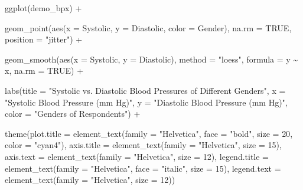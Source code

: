 \documentclass[
]{book}
\newenvironment{Shaded}{\begin{snugshade}}{\end{snugshade}}
\newcommand{\AttributeTok}[1]{\textcolor[rgb]{0.77,0.63,0.00}{#1}}
\newcommand{\ConstantTok}[1]{\textcolor[rgb]{0.00,0.00,0.00}{#1}}
\newcommand{\DecValTok}[1]{\textcolor[rgb]{0.00,0.00,0.81}{#1}}
\newcommand{\FunctionTok}[1]{\textcolor[rgb]{0.00,0.00,0.00}{#1}}
\newcommand{\NormalTok}[1]{#1}
\newcommand{\SpecialCharTok}[1]{\textcolor[rgb]{0.00,0.00,0.00}{#1}}
\newcommand{\StringTok}[1]{\textcolor[rgb]{0.31,0.60,0.02}{#1}}
\begin{document}
\begin{Shaded}
\begin{Highlighting}[]
\FunctionTok{ggplot}\NormalTok{(demo\_bpx) }\SpecialCharTok{+}

    \FunctionTok{geom\_point}\NormalTok{(}\FunctionTok{aes}\NormalTok{(}\AttributeTok{x =}\NormalTok{ Systolic, }\AttributeTok{y =}\NormalTok{ Diastolic, }\AttributeTok{color =}\NormalTok{ Gender), }
             \AttributeTok{na.rm =} \ConstantTok{TRUE}\NormalTok{,}
             \AttributeTok{position =} \StringTok{"jitter"}\NormalTok{) }\SpecialCharTok{+}
    
    \FunctionTok{geom\_smooth}\NormalTok{(}\FunctionTok{aes}\NormalTok{(}\AttributeTok{x =}\NormalTok{ Systolic, }\AttributeTok{y =}\NormalTok{ Diastolic),}
                \AttributeTok{method =} \StringTok{"loess"}\NormalTok{,}
                \AttributeTok{formula =}\NormalTok{ y }\SpecialCharTok{\textasciitilde{}}\NormalTok{ x,}
                \AttributeTok{na.rm =} \ConstantTok{TRUE}\NormalTok{) }\SpecialCharTok{+} 
    
    \FunctionTok{labs}\NormalTok{(}\AttributeTok{title =} \StringTok{"Systolic vs. Diastolic Blood Pressures of Different Genders"}\NormalTok{,}
         \AttributeTok{x =} \StringTok{"Systolic Blood Pressure (mm Hg)"}\NormalTok{, }
         \AttributeTok{y =} \StringTok{"Diastolic Blood Pressure (mm Hg)"}\NormalTok{,}
         \AttributeTok{color =} \StringTok{"Genders of Respondents"}\NormalTok{) }\SpecialCharTok{+}

    \FunctionTok{theme}\NormalTok{(}\AttributeTok{plot.title =} \FunctionTok{element\_text}\NormalTok{(}\AttributeTok{family =} \StringTok{"Helvetica"}\NormalTok{, }\AttributeTok{face =} \StringTok{"bold"}\NormalTok{, }\AttributeTok{size =} \DecValTok{20}\NormalTok{, }\AttributeTok{color =} \StringTok{"cyan4"}\NormalTok{),}
          \AttributeTok{axis.title =} \FunctionTok{element\_text}\NormalTok{(}\AttributeTok{family =} \StringTok{"Helvetica"}\NormalTok{, }\AttributeTok{size =} \DecValTok{15}\NormalTok{),}
          \AttributeTok{axis.text =} \FunctionTok{element\_text}\NormalTok{(}\AttributeTok{family =} \StringTok{"Helvetica"}\NormalTok{, }\AttributeTok{size =} \DecValTok{12}\NormalTok{),}
          \AttributeTok{legend.title =} \FunctionTok{element\_text}\NormalTok{(}\AttributeTok{family =} \StringTok{"Helvetica"}\NormalTok{, }\AttributeTok{face =} \StringTok{"italic"}\NormalTok{, }\AttributeTok{size =} \DecValTok{15}\NormalTok{), }
          \AttributeTok{legend.text =} \FunctionTok{element\_text}\NormalTok{(}\AttributeTok{family =} \StringTok{"Helvetica"}\NormalTok{, }\AttributeTok{size =} \DecValTok{12}\NormalTok{))}
\end{Highlighting}
\end{Shaded}
\end{document}
